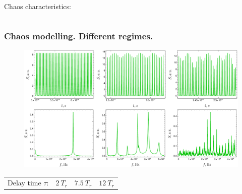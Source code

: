 \begin{frame}
\begin{columns}
\begin{column}{.6\linewidth}
      Chaos characteristics:
      \begin{itemize}
      \end{itemize}
    \end{column}
  \end{columns}
  
\end{frame}

\begin{frame}
  \frametitle{Chaos modelling. Different regimes.}
  
  \begin{figure}
    \centering
    \includegraphics[width=\linewidth]{figures/chaos_and_spectra.pdf}
  \end{figure}
  
  \begin{center}
    \begin{tabular}{c|c|c}
      Delay time $\tau$:\ \ $2 \ T_r$ & $7.5 \ T_r$ & $12 \ T_r$
    \end{tabular}
  \end{center}
  
  
  
\end{frame}

